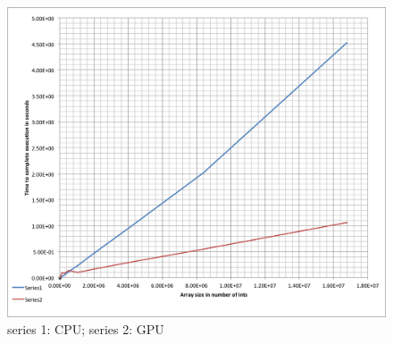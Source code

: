 \documentclass[11pt,letter]{article}
\begin{document}
\begin{figure}[h]
\centering
\includegraphics[width=1\textwidth]{graph.png}
\caption{series 1: CPU; series 2: GPU}
\label{fig:awesome_image}
\end{figure}





%
%
%
%
%
%


\end{document}
